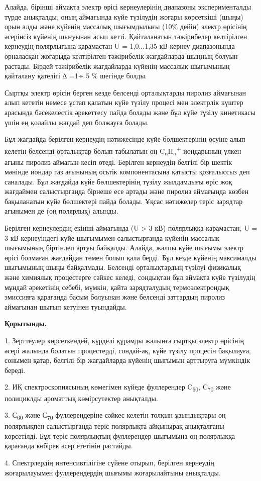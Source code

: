 \begin{multicols}{2}
Алайда, бірінші аймақта электр өрісі кернеулерінің диапазоны
эксперименталды түрде анықталды, оның аймағында күйе түзілудің жоғары
көрсеткіші (шыңы) орын алды және күйенің массалық шығымдылығы (10\%
дейін) электр өрісінің әсерінсіз күйенің шығуынан асып кетті.
Қайталанатын тәжірибелер келтірілген кернеудің полярлығына қарамастан U
= 1,0...1,35 кВ кернеу диапазонында орналасқан жоғарыда келтірілген
тәжірибелік жағдайларда шыңның болуын растады. Бірдей тәжірибелік
жағдайларда күйенің массалық шығымының қайталану қателігі ∆ =1÷ 5 \%
шегінде болды.

Сыртқы электр өрісін берген кезде белсенді орталықтарды пиролиз
аймағынан алып кететін немесе ұстап қалатын күйе түзілу процесі мен
электрлік күштер арасында бәсекелестік әрекеттесу пайда болады және бұл
күйе түзілу кинетикасы үшін ең қолайлы жағдай деп болжауға болады.

Бұл жағдайда берілген кернеудің нәтижесінде күйе бөлшектерінің өсуіне
алып келетін белсенді орталықтар болып табылатын оң
C\textsubscript{n}H\textsubscript{n}\textsuperscript{+} иондарының үлкен
ағыны пиролиз аймағын кесіп өтеді. Берілген кернеудің белгілі бір шектік
мәнінде иондар газ ағынының осьтік компонентасына қатысты қозғалыссыз
деп саналады. Бұл жағдайда күйе бөлшектерінің түзілу жылдамдығы өріс жоқ
жағдаймен салыстырғанда бірнеше есе артады және пиролиз аймағында көзбен
бақыланатын күйе бөлшектері пайда болады. Ұқсас нәтижелер теріс зарядтар
ағынымен де (оң полярлық) алынды.

Берілген кернеулердің екінші аймағында (U \textgreater{} 3 кВ)
полярлыққа қарамастан, U = 3 кВ кернеуіндегі күйе шығымымен
салыстырғанда күйенің массалық шығымының біртіндеп артуы байқалды.
Алайда, жалпы күйе шығымы электр өрісі болмаған жағдайдан төмен болып
қала берді. Бұл кезде күйенің максималды шығымының шыңы байқалмады.
Белсенді орталықтардың түзілуі физикалық және химиялық процестерге
сәйкес келеді, сондықтан бұл аймақта күйе түзілудің мұндай әрекетінің
себебі, мүмкін, қайта зарядталудың термоэлектрондық эмиссияға қарағанда
басым болуынан және белсенді заттардың пиролиз аймағынан шығып кетуінен
туындайды.

{\bfseries Қорытынды.}

1. Зерттеулер көрсеткендей, күрделі құрамды жалынға сыртқы электр
өрісінің әсері жалында болатын процестерді, сондай-ақ, күйе түзілу
процесін бақылауға, сонымен қатар, белгілі бір жағдайларда күйенің
шығымын арттыруға мүмкіндік береді.

2. ИҚ спектроскопиясының көмегімен күйеде фуллерендер
C\textsubscript{60}, C\textsubscript{70} және полициклды ароматтық
көмірсутектер анықталды.

3. С\textsubscript{60} және С\textsubscript{70} фуллерендеріне сәйкес
келетін толқын ұзындықтары оң полярлықпен салыстырғанда теріс полярлықта
айқынырақ анықталғаны көрсетілді. Бұл теріс полярлықтың фуллерендер
шығымына оң полярлыққа қарағанда көбірек әсер ететінін растайды.

4. Спектрлердің интенсивтілігіне сүйене отырып, берілген кернеудің
жоғарылауымен фуллерендердің шығымы жоғарылайтыны анықталды.
\end{multicols}

